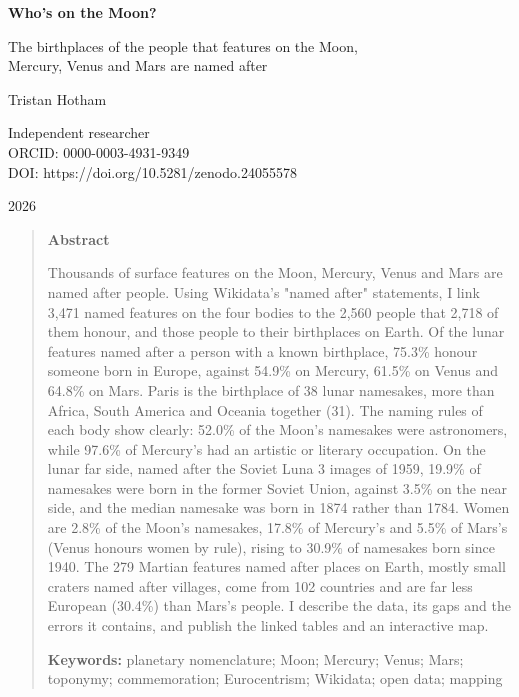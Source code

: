 \documentclass[11pt,a4paper]{article}
\begin{document}
\begin{center}
{\Large\bfseries Who's on the Moon?\par}
\vspace{0.4em}
{\large The birthplaces of the people that features on the Moon,\\Mercury, Venus and Mars are named after\par}
\vspace{1.2em}
{\large Tristan Hotham\par}
\vspace{0.3em}
{\small Independent researcher\\
ORCID: 0000-0003-4931-9349\\
DOI: https://doi.org/10.5281/zenodo.24055578\par}
\vspace{0.8em}
2026
\end{center}

\begin{quote}
\small
\begin{center}\textbf{Abstract}\end{center}
Thousands of surface features on the Moon, Mercury, Venus and Mars are named after people. Using Wikidata's "named after" statements, I link 3,471 named features on the four bodies to the 2,560 people that 2,718 of them honour, and those people to their birthplaces on Earth. Of the lunar features named after a person with a known birthplace, 75.3\% honour someone born in Europe, against 54.9\% on Mercury, 61.5\% on Venus and 64.8\% on Mars. Paris is the birthplace of 38 lunar namesakes, more than Africa, South America and Oceania together (31). The naming rules of each body show clearly: 52.0\% of the Moon's namesakes were astronomers, while 97.6\% of Mercury's had an artistic or literary occupation. On the lunar far side, named after the Soviet Luna 3 images of 1959, 19.9\% of namesakes were born in the former Soviet Union, against 3.5\% on the near side, and the median namesake was born in 1874 rather than 1784. Women are 2.8\% of the Moon's namesakes, 17.8\% of Mercury's and 5.5\% of Mars's (Venus honours women by rule), rising to 30.9\% of namesakes born since 1940. The 279 Martian features named after places on Earth, mostly small craters named after villages, come from 102 countries and are far less European (30.4\%) than Mars's people. I describe the data, its gaps and the errors it contains, and publish the linked tables and an interactive map.

\textbf{Keywords:} planetary nomenclature; Moon; Mercury; Venus; Mars; toponymy; commemoration; Eurocentrism; Wikidata; open data; mapping
\end{quote}
\end{document}
